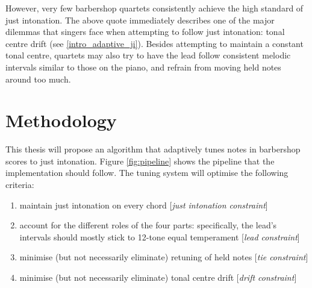 \documentclass[a4paper]{article}
\begin{document}
However, very few barbershop quartets consistently achieve the high standard of just intonation. \cite{garnett_ethics_1999} The above quote immediately describes one of the major dilemmas that singers face when attempting to follow just intonation: tonal centre drift (see \ref{intro_adaptive_ji}). Besides attempting to maintain a constant tonal centre, quartets may also try to have the lead follow consistent melodic intervals similar to those on the piano, and refrain from moving held notes around too much.

\section{Methodology}
\label{methodoloy}
This thesis will propose an algorithm that adaptively tunes notes in barbershop scores to just intonation. Figure \ref{fig:pipeline} shows the pipeline that the implementation should follow. The tuning system will optimise the following criteria:
\begin{enumerate}
	\item maintain just intonation on every chord [\textit{just intonation constraint}]
	\item account for the different roles of the four parts: specifically, the lead's intervals should mostly stick to 12-tone equal temperament [\textit{lead constraint}]
	\item minimise (but not necessarily eliminate) retuning of held notes [\textit{tie constraint}]
	\item minimise (but not necessarily eliminate) tonal centre drift [\textit{drift constraint}]
\end{enumerate}
\end{document}
